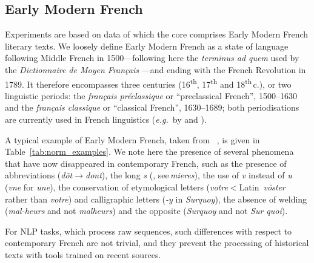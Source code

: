 \subsection{Early Modern French}\label{def:early}

Experiments are based on data of which the core comprises Early Modern French literary texts. We loosely define Early Modern French as a state of language following Middle French in 1500---following here the \textit{terminus ad quem} used by the \textit{Dictionnaire de Moyen Français} \cite{martin_dictionnaire_2020}---and ending with the French Revolution in 1789. It therefore encompasses three centuries (16\textsuperscript{th}, 17\textsuperscript{th} and 18\textsuperscript{th}\,c.), or two linguistic periods: the \textit{français préclassique} or ``preclassical French'', 1500--1630 and the \textit{français classique} or ``classical French'', 1630--1689; both periodisations are currently used in French linguistics (\textit{e.g.}~by  and ).

A typical example of Early Modern French, taken from ~, is given in Table~\ref{tab:norm_examples}. We note here the presence of several phenomena that have now disappeared in contemporary French, such as the presence of abbreviations (\textit{dõt}$\to$\textit{dont}), the long \textit{s} (\textit{\longs{}}, see\,\textit{mi\longs{}eres}), the use of \textit{v} instead of \textit{u} (\textit{vne} for \textit{une}), the conservation of etymological letters (\textit{vo\longs{}tre}$<$Latin~\textit{vŏster} rather than \textit{votre}) and calligraphic letters (\textit{-y} in \textit{Surquoy}), the absence of welding  (\textit{\mbox{mal-heurs}} and not \textit{malheurs}) and the opposite (\textit{Surquoy} and not \textit{Sur quoi}).

For NLP tasks, which process raw sequences, such differences with respect to contemporary French are not trivial, and they prevent the processing of historical texts with tools trained on recent sources.

\subsection{\texorpdfstring{\freemmax}{FREEM max}}\label{freem_max}

